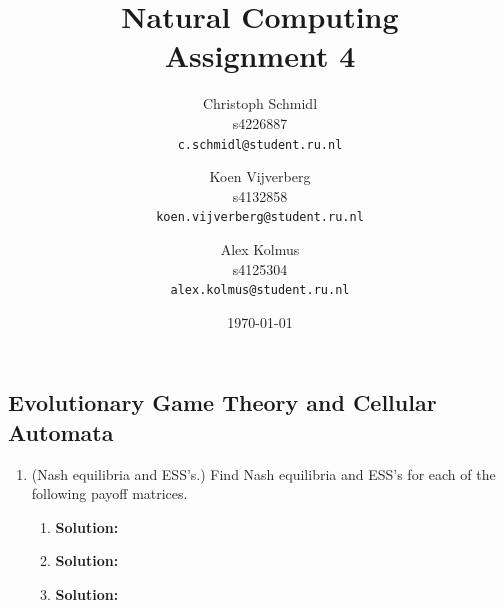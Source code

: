 \documentclass[a4paper]{article}
\title{Natural Computing\\Assignment 4}
\author{
  Christoph Schmidl\\ s4226887\\      \texttt{c.schmidl@student.ru.nl}
  \and
  Koen Vijverberg\\ s4132858\\     \texttt{koen.vijverberg@student.ru.nl}
  \and
  Alex Kolmus\\	s4125304\\	\texttt{alex.kolmus@student.ru.nl}
}
\date{\today}
\begin{document}
\maketitle


\subsection*{Evolutionary Game Theory and Cellular Automata}

\begin{enumerate}

	\item(Nash equilibria and ESS's.) Find Nash equilibria and ESS's for each of the following payoff matrices.
	
	\begin{enumerate}
		\item 
		\begin{minipage}[t]{\linewidth}
          \centering
    \end{minipage}
    \vspace{1em}
		\textbf{Solution:}\\
		
		
		
		\item \begin{minipage}[t]{\linewidth}
          \centering
    \end{minipage}
    \vspace{1em}
		\textbf{Solution:}\\
		
		
		
		
		\item \begin{minipage}[t]{\linewidth}
          \centering
    \end{minipage}
    \vspace{1em}	
    \textbf{Solution:}\\	
		

\end{enumerate}
\end{enumerate}
\end{document}
